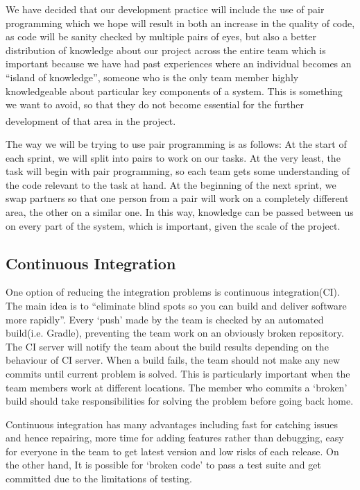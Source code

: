\documentclass[10pt, a4paper]{article}
\begin{document}
We have decided that our development practice will include the use of pair programming  which we hope will result in both an increase in the quality of code, as code will be sanity checked by multiple pairs of eyes, but also a better distribution of knowledge about our project across the entire team which is important because we have had past experiences where an individual becomes an “island of knowledge”, someone who is the only team member highly knowledgeable about particular key components of a system. This is something we want to avoid, so that they do not become essential for the further development of that area in the project\textsuperscript{\cite{pairprog2}}.

The way we will be trying to use pair programming is as follows:
At the start of each sprint, we will split into pairs to work on our tasks. At the very least, the task will begin with pair programming, so each team gets some understanding of the code relevant to the task at hand. At the beginning of the next sprint, we swap partners so that one person from a pair will work on a completely different area, the other on a similar one. In this way, knowledge can be passed between us on every part of the system, which is important, given the scale of the project.

\subsection{Continuous Integration}

One option of reducing the integration problems is continuous integration(CI). The main idea is to “eliminate blind spots so you can build and deliver software more rapidly”.  Every ‘push’ made by the team is checked by an automated build(i.e. Gradle), preventing the team work on an obviously broken repository. The CI server will notify the team about the build results depending on the behaviour of CI server. When a build fails, the team should not make any new commits until current problem is solved. This is particularly important when the team members work at different locations. The member who commits a ‘broken’ build should take responsibilities for solving the problem before going back home. 

Continuous integration has many advantages including fast for catching  issues and hence repairing, more time for adding features rather than debugging, easy for everyone in the team to get latest version and  low risks of each release. On the other hand, It is possible for ‘broken code’ to pass a test suite and get committed  due to the limitations of testing.
\end{document}
